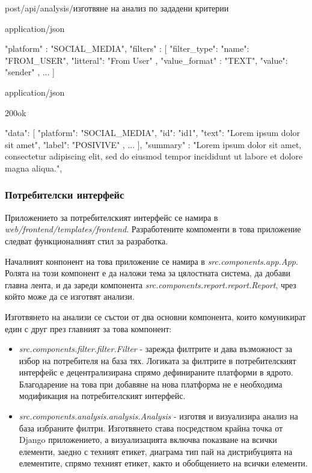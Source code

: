 \documentclass{article}
\begin{document}
\begin{apiRoute}{post}{/api/analysis/}{изготвяне на анализ по зададени критерии}
\begin{routeRequest}{application/json}
\begin{routeRequestBody}
{
"platform" : "SOCIAL_MEDIA",
"filters" : [
{
"filter_type": {
"name": "FROM_USER",
"litteral": "From User"
},
"value_format" : "TEXT",
"value": "sender"
},
...
]
}
\end{routeRequestBody}
\end{routeRequest}
\begin{routeResponse}{application/json}
\begin{routeResponseItem}{200}{ok}
\begin{routeResponseItemBody}
{
"data": [
{
"platform": "SOCIAL_MEDIA",
"id": "id1",
"text": "Lorem ipsum dolor sit amet",
"label": "POSIVIVE"
},
...
],
"summary" : "Lorem ipsum dolor sit amet, consectetur adipiscing elit, sed do eiusmod tempor incididunt ut labore et dolore magna aliqua.",
}
\end{routeResponseItemBody}
\end{routeResponseItem}
\end{routeResponse}
\end{apiRoute}

\subsubsection{Потребителски интерфейс}

Приложението за потребителският интерфейс се намира в \textit{web/frontend/templates/frontend}. Разработените
компоменти в това приложение следват функционалният стил за разработка.

Началният конпонент на това приложение се намира в \textit{src.components.app.App}. Ролята на този компонент е да
наложи тема за цялостната система, да добави главна лента, и да зареди компонента
\textit{src.components.report.report.Report}, чрез който може да се изготвят анализи.

Изготвянето на анализи се състои от два основни компонента, които комуникират един с друг през главният за това
компонент:

\begin{itemize}
\item \textit{src.components.filter.filter.Filter} - зарежда филтрите и дава възможност за избор на потребителя на
база тях. Логиката за филтрите в потребителският интерфейс е децентрализирана спрямо дефинираните платформи в ядрото.
Благодарение на това при добавяне на нова платформа не е необходима модификация на потребителският интерфейс.
\item \textit{src.components.analysis.analysis.Analysis} - изготвя и визуализира анализ на база избраните филтри.
Изготвянето става посредством крайна точка от Django приложението, а визуализацията включва показване на всички
елементи, заедно с техният етикет, диаграма тип пай на дистрибуцията на елементите, спрямо техният етикет, както и
обобщението на всички елементи.
\end{itemize}
\end{document}
